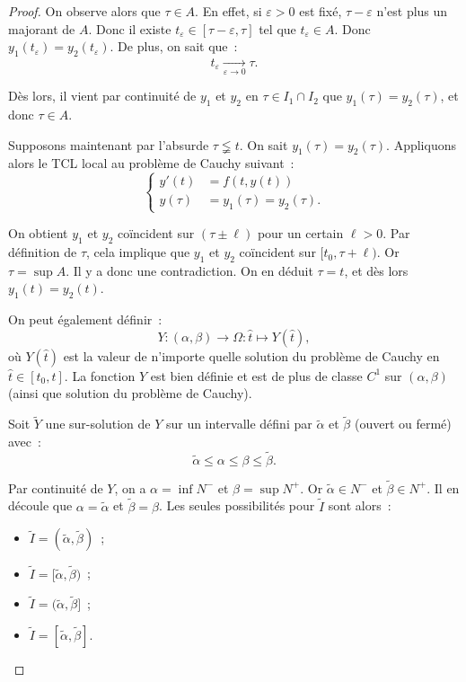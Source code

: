 \documentclass{report}
\theoremstyle{definition}
\theoremstyle{remark}
\numberwithin{equation}{section}
\begin{document}
\begin{proof}
					On observe alors que $\tau \in A$. En effet, si $\varepsilon > 0$ est fixé, $\tau-\varepsilon$ n'est plus un majorant de $A$. Donc il existe
					$t_\varepsilon \in [\tau-\varepsilon, \tau]$ tel que $t_\varepsilon \in A$. Donc $y_1(t_\varepsilon)=y_2(t_\varepsilon)$. De plus, on sait que~:
					\begin{equation}
						t_\varepsilon \xrightarrow[\varepsilon \to 0]{} \tau.
					\end{equation}

					Dès lors, il vient par continuité de $y_1$ et $y_2$ en $\tau \in I_1 \cap I_2$ que $y_1(\tau) = y_2(\tau)$, et donc $\tau \in A$.

					Supposons maintenant par l'absurde $\tau \lneqq t$.  On sait $y_1(\tau) = y_2(\tau)$. Appliquons alors le TCL local au problème de Cauchy suivant~:
					\begin{equation}
						\begin{cases}
						y'(t) &= f(t, y(t)) \\
						y(\tau) &= y_1(\tau) = y_2(\tau).
					\end{cases}
					\end{equation}

					On obtient $y_1$ et $y_2$ coïncident sur $(\tau \pm \ell)$ pour un certain $\ell > 0$. Par définition de $\tau$, cela implique que $y_1$ et
					$y_2$ coïncident sur $[t_0, \tau+\ell)$. Or $\tau = \sup A$. Il y a donc une contradiction. On en déduit $\tau = t$, et dès lors
					$y_1(t) = y_2(t)$.

					On peut également définir~:
					\begin{equation}
						Y : (\alpha, \beta) \to \Omega : \hat t \mapsto Y(\hat t),
					\end{equation}
					où $Y(\hat t)$ est la valeur de n'importe quelle solution du problème de Cauchy en $\hat t \in [t_0, t]$. La fonction $Y$ est bien définie
					et est de plus de classe $C^1$ sur $(\alpha, \beta)$ (ainsi que solution du problème de Cauchy).

					Soit $\widetilde Y$ une sur-solution de $Y$ sur un intervalle défini par $\widetilde \alpha$ et $\widetilde \beta$ (ouvert ou fermé) avec~:
					\begin{equation}
						\widetilde \alpha \leq \alpha \leq \beta \leq \widetilde \beta.
					\end{equation}

					Par continuité de $Y$, on a $\alpha = \inf N^-$ et $\beta = \sup N^+$. Or $\widetilde \alpha \in N^-$ et $\widetilde \beta \in N^+$. Il en
					découle que $\alpha = \widetilde \alpha$ et $\widetilde \beta = \beta$. Les seules possibilités pour $\widetilde I$ sont alors~:
					\begin{itemize}
						\item $\widetilde I = (\widetilde \alpha, \widetilde \beta)$~;
						\item $\widetilde I = [\widetilde \alpha, \widetilde \beta)$~;
						\item $\widetilde I = (\widetilde \alpha, \widetilde \beta]$~;
						\item $\widetilde I = [\widetilde \alpha, \widetilde \beta]$.
					\end{itemize}


\end{proof}
\end{document}
